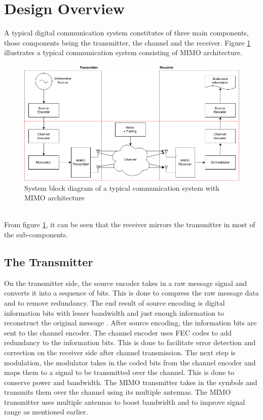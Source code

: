\documentclass[11pt]{report}
\begin{document}
\section{Design Overview}
\label{sec:design}
A typical digital communication system constitutes of three main components, those components being the transmitter, the channel and the receiver. Figure \ref{fig:sys} illustrates a typical communication system consisting of MIMO architecture. 
\\
\begin{figure}[h]
	\centering
	\includegraphics[width=\textwidth]{resources/systemDiagram.png}
	\caption{System block diagram of a typical communication system with MIMO architecture}
	\label{fig:sys}
\end{figure}{}
\\
From figure \ref{fig:sys}, it can be seen that the receiver mirrors the transmitter in most of the sub-components. 

\subsection{The Transmitter}
\label{sub:trans}

On the transmitter side, the source encoder takes in a raw message signal and converts it into a sequence of bits. This is done to compress the raw message data and to remove redundancy. The end result of source encoding is digital information bits with lesser bandwidth and just enough information to reconstruct the original message \cite{B10}. After source encoding, the information bits are sent to the channel encoder. The channel encoder uses FEC codes to add redundancy to the information bits. This is done to facilitate error detection and correction on the receiver side after channel transmission. The next step is modulation, the modulator takes in the coded bits from the channel encoder and maps them to a signal to be transmitted over the channel. This is done to conserve power and bandwidth. The MIMO transmitter takes in the symbols and transmits them over the channel using its multiple antennas. The MIMO transmitter uses multiple antennas to boost bandwidth and to improve signal range as mentioned earlier.
\end{document}
